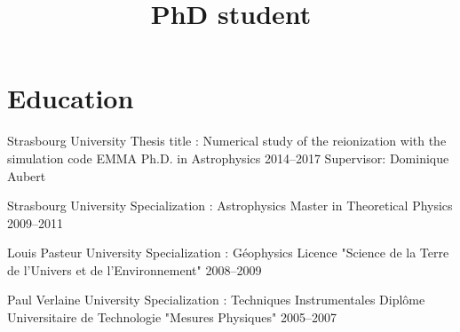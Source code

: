 \documentclass[11pt,a4paper,sans]{moderncv}
\title{PhD student}
\begin{document}
\makecvtitle


%
%



\section{Education}

\cventry
{Strasbourg University}
{Thesis title : Numerical study of the reionization with the simulation code EMMA}
{Ph.D. in Astrophysics}
{2014--2017}
{}
{Supervisor: Dominique Aubert}


\cventry
{Strasbourg University}
{Specialization : Astrophysics}
{Master in Theoretical Physics}
{2009--2011}
{}
{}

\cventry
{Louis Pasteur University}
{Specialization : Géophysics}
{Licence "Science de la Terre de l'Univers et de l’Environnement"}
{2008--2009}
{}
{}


\cventry
{Paul Verlaine University}
{Specialization : Techniques Instrumentales}
{Diplôme Universitaire de Technologie "Mesures Physiques"}
{2005--2007}
{}
{}


\end{document}
